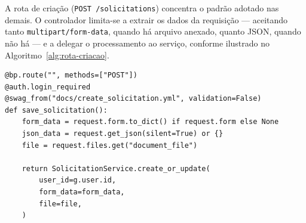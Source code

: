 A rota de criação (\texttt{POST /solicitations}) concentra o padrão 
adotado nas demais. O controlador limita-se a extrair os dados da 
requisição — aceitando tanto \texttt{multipart/form-data}, quando há 
arquivo anexado, quanto JSON, quando não há — e a delegar o 
processamento ao serviço, conforme ilustrado no Algoritmo~\ref{alg:rota-criacao}.

\begin{algorithm}[htbp]
\caption{Estrutura da rota de criação de solicitação.}
\label{alg:rota-criacao}
\begin{verbatim}
@bp.route("", methods=["POST"])
@auth.login_required
@swag_from("docs/create_solicitation.yml", validation=False)
def save_solicitation():
    form_data = request.form.to_dict() if request.form else None
    json_data = request.get_json(silent=True) or {}
    file = request.files.get("document_file")

    return SolicitationService.create_or_update(
        user_id=g.user.id,
        form_data=form_data,
        file=file,
    )
\end{verbatim}
\end{algorithm}

